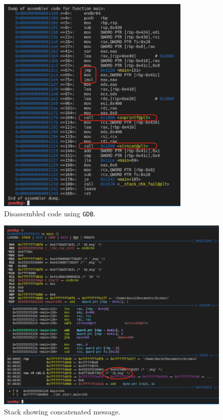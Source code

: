 \documentclass[12pt]{article}
\begin{document}
\begin{figure}[!ht]
    \centering
    \includegraphics[width=0.82\textwidth]{figure06.png}
    \caption{Disassembled code using \texttt{GDB}.}
    \label{fig:disas}
\end{figure}

\begin{figure}[!ht]
    \centering
    \includegraphics[width=\textwidth]{figure07.png}
    \caption{Stack showing concatenated message.}
    \label{fig:stack}
\end{figure}
\end{document}
